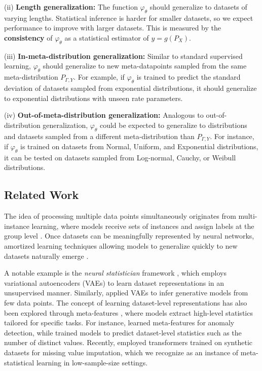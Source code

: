 (ii) \textbf{Length generalization:} The function \( \varphi_{\theta} \) should generalize to datasets of varying lengths. Statistical inference is harder for smaller datasets, so we expect performance to improve with larger datasets. This is measured by the \textbf{consistency} of \( \varphi_{\theta} \) as a statistical estimator of \( y = g(P_X) \).

(iii) \textbf{In-meta-distribution generalization:} Similar to standard supervised learning, \( \varphi_{\theta} \) should generalize to new meta-datapoints sampled from the same meta-distribution \( P_{\Gamma, Y} \). For example, if \( \varphi_{\theta} \) is trained to predict the standard deviation of datasets sampled from exponential distributions, it should generalize to exponential distributions with unseen rate parameters.

(iv) \textbf{Out-of-meta-distribution generalization:} Analogous to out-of-distribution generalization, \( \varphi_{\theta} \) could be expected to generalize to distributions and datasets sampled from a different meta-distribution than \( P_{\Gamma, Y} \). For instance, if \( \varphi_{\theta} \) is trained on datasets from Normal, Uniform, and Exponential distributions, it can be tested on datasets sampled from Log-normal, Cauchy, or Weibull distributions.

\subsection{Related Work}
The idea of processing multiple data points simultaneously originates from multi-instance learning, where models receive sets of instances and assign labels at the group level \cite{maron1997framework, dietterich1997solving, ilse2018attention}. Once datasets can be meaningfully represented by neural networks, amortized learning techniques allowing models to generalize quickly to new datasets naturally emerge \cite{ganguly2023amortized, lopez2015towards, kim2024targeted}.

A notable example is the \textit{neural statistician} framework \cite{edwards2017towards}, which employs variational autoencoders (VAEs) to learn dataset representations in an unsupervised manner. Similarly, \citet{hewitt2018variational} applied VAEs to infer generative models from few data points. The concept of learning dataset-level representations has also been explored through meta-features \cite{jomaa2021dataset2vec, kotlar2021novel, 10136150}, where models extract high-level statistics tailored for specific tasks. For instance, \citet{kotlar2021novel} learned meta-features for anomaly detection, while \citet{wu2022learning} trained models to predict dataset-level statistics such as the number of distinct values. Recently, \citet{hollmann2025accurate} employed transformers trained on synthetic datasets for missing value imputation, which we recognize as an instance of meta-statistical learning in low-sample-size settings.

